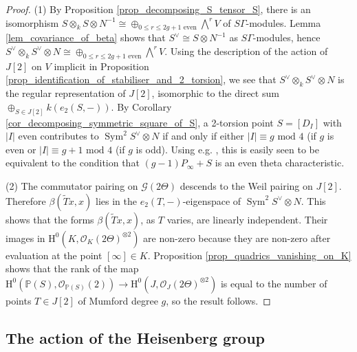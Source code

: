 \documentclass{article} %
\numberwithin{equation}{section}
\DeclareMathOperator{\Sym}{Sym}
\renewcommand{\P}{\mathbb{P}}
\renewcommand{\O}{\mathcal{O}}
\newcommand{\HH}{\mathrm{H}}
\newcommand{\cO}{\mathcal{O}}
\begin{document}
\begin{proof}
    (1) By Proposition \ref{prop_decomposing_S_tensor_S}, there is an isomorphism $S \otimes_k S \otimes N^{-1} \cong \oplus_{0 \leq r \leq 2g+1 \text{ even}} \bigwedge^r V$ of $S \Gamma$-modules. Lemma \ref{lem_covariance_of_beta} shows that $S^\vee \cong S \otimes N^{-1}$ as $S \Gamma$-modules, hence $S^\vee \otimes_k S^\vee \otimes N \cong \oplus_{0 \leq r \leq 2g+1 \text{ even}} \bigwedge^r V$. Using the description of the action of $J[2]$ on $V$ implicit in Proposition \ref{prop_identification_of_stabiliser_and_2_torsion}, we see that $S^\vee \otimes_k S^\vee \otimes N$ is the regular representation of $J[2]$, isomorphic to the direct sum $\oplus_{S \in J[2]} k(e_2(S, -))$. By Corollary \ref{cor_decomposing_symmetric_square_of_S}, a 2-torsion point $S = [D_I]$ with $|I|$ even contributes to $\Sym^2 S^\vee \otimes N$ if and only if either $|I| \equiv g \text{ mod }4$ (if $g$ is even or $|I| \equiv g+1 \text{ mod }4$ (if $g$ is odd). Using e.g. \cite[Proposition 6.3]{MumfordTataII}, this is easily seen to be equivalent to the condition that $(g-1) P_\infty + S$ is an even theta characteristic.

    (2) The commutator pairing on $\mathcal{G}(2 \Theta)$ descends to the Weil pairing on $J[2]$. Therefore $\beta( \widetilde{T} x,x)$ lies in the $e_2(T, -)$-eigenspace of $\Sym^2 S^\vee \otimes N$. This shows that the forms $\beta( \widetilde{T} x,x)$, as $T$ varies, are linearly independent. Their images in $\HH^0(K, \cO_K(2 \Theta)^{\otimes 2})$ are non-zero because they are non-zero after evaluation at the point $[\infty] \in K$. Proposition \ref{prop_quadrics_vanishing_on_K} shows that the rank of the map $\HH^0(\P(S), \cO_{\P(S)}(2)) \to\HH^0(J, \O_J(2 \Theta)^{\otimes 2})$ is equal to the number of points $T \in J[2]$ of Mumford degree $g$, so the result follows. 
\end{proof}

\subsection{The action of the Heisenberg group}\label{subsec_action_of_Heisenberg_group}
\end{document}
